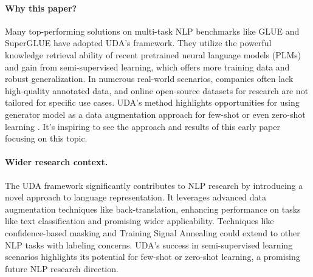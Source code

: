\documentclass{article}
\begin{document}
\paragraph{Why this paper?}
Many top-performing solutions \cite{zhong2022efficient, wang2021zerolabel, raffel2023exploring} 
on multi-task NLP benchmarks like GLUE \cite{wang2019glue} 
and SuperGLUE \cite{wang2019superglue} 
have adopted UDA's framework. They utilize the powerful knowledge retrieval ability of 
recent pretrained neural language models (PLMs) and gain from semi-supervised learning, which 
offers more training data and robust generalization. In numerous real-world scenarios, 
companies often lack high-quality annotated data, and online open-source datasets for 
research are not tailored for specific use cases. UDA's method highlights 
opportunities for using generator model as a data augmentation approach for few-shot or even 
zero-shot learning \cite{meng2022generating}. 
It's inspiring to see the approach and results of this early paper 
focusing on this topic.

\paragraph{Wider research context.}
The UDA framework significantly contributes to NLP research by introducing a novel 
approach to language representation. It leverages advanced data augmentation techniques 
like back-translation, enhancing performance on tasks like text classification and 
promising wider applicability. Techniques like confidence-based masking and Training 
Signal Annealing could extend to other NLP tasks with labeling concerns. UDA's success 
in semi-supervised learning scenarios highlights its potential for few-shot or 
zero-shot learning, a promising future NLP research direction.
\end{document}
